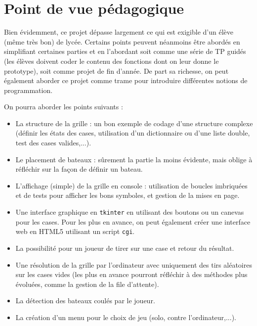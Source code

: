 \chapter{Point de vue pédagogique}

Bien évidemment, ce projet dépasse largement ce qui est exigible d'un élève (même très bon) de lycée. Certains points peuvent néanmoins être abordés en simplifiant certaines parties et en l'abordant soit comme une série de TP guidés (les élèves doivent coder le contenu des fonctions dont on leur donne le prototype), soit comme projet de fin d'année. De part sa richesse, on peut également aborder ce projet comme trame pour introduire différentes notions de programmation. 

On pourra aborder les points suivants :
\begin{itemize}
\item La structure de la grille : un bon exemple de codage d'une structure complexe (définir les états des cases, utilisation d'un dictionnaire ou d'une liste double, test des cases valides,...).
\item Le placement de bateaux : sûrement la partie la moins évidente, mais oblige à réfléchir sur la façon de définir un bateau.
\item L'affichage (simple) de la grille en console : utilisation de boucles imbriquées et de tests pour afficher les bons symboles, et gestion de la mises en page.
\item Une interface graphique en \texttt{tkinter} en utilisant des boutons ou un canevas pour les cases. Pour les plus en avance, on peut également créer une interface web en HTML5 utilisant un script \texttt{cgi}.
\item La possibilité pour un joueur de tirer sur une case et retour du résultat.
\item Une résolution de la grille par l'ordinateur avec uniquement des tirs aléatoires sur les cases vides (les plus en avance pourront réfléchir à des méthodes plus évoluées, comme la gestion de la file d'attente).
\item La détection des bateaux coulés par le joueur.
\item La création d'un menu pour le choix de jeu (solo, contre l'ordinateur,...).
\end{itemize}

\medskip


